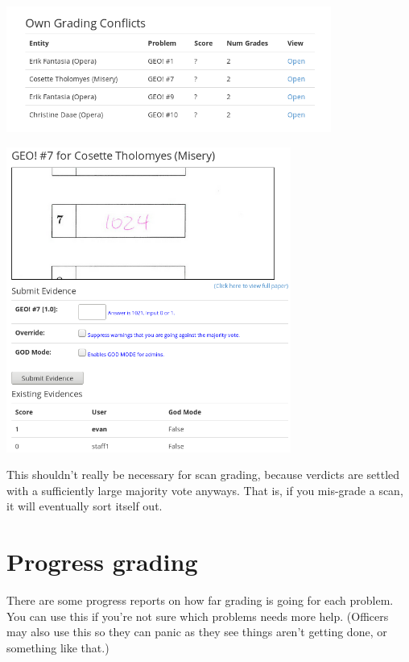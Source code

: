 \begin{center}
	\includegraphics[width=0.8\textwidth]{images/viewconflict.png}
\end{center}
\begin{center}
	\includegraphics[width=0.7\textwidth]{images/viewverdict.png}
\end{center}

This shouldn't really be necessary for scan grading,
because verdicts are settled with a sufficiently large majority vote anyways.
That is, if you mis-grade a scan, it will eventually sort itself out.

\section{Progress grading}
There are some progress reports on how far grading is going for each problem.
You can use this if you're not sure which problems needs more help.
(Officers may also use this so they can panic as they see things aren't getting done,
or something like that.)

